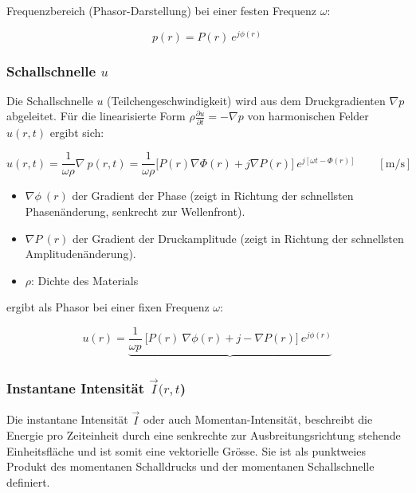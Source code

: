 Frequenzbereich (Phasor-Darstellung) bei einer festen Frequenz $\omega$:

\begin{equation}
p(r) = P(r) \: e^{j \phi (r)}
\label{helmholtz:PhasorSchalldruck}
\end{equation}

\subsubsection{Schallschnelle  $u$}
Die Schallschnelle $u$ (Teilchengeschwindigkeit) wird aus dem Druckgradienten $\nabla p$ abgeleitet. Für die linearisierte Form $ \rho \frac{\partial u}{\partial t} = - \nabla p$ von harmonischen Felder $u(r,t)$  ergibt sich:

\begin{equation}
u(r,t) = \frac{1}{\omega \rho} \nabla \: p(r,t) = \frac{1}{\omega \rho} \bigg[ P(r) \nabla \Phi(r) + j\nabla P(r)  \bigg] \: e^{j[\omega t -\Phi(r)]} \qquad [\si{\metre / \second}]
\end{equation}

\begin{itemize}
\item $\nabla \phi \: (r)$ der Gradient der Phase (zeigt in Richtung der schnellsten Phasenänderung, senkrecht zur Wellenfront).
\item $\nabla P \:(r)$ der Gradient der Druckamplitude (zeigt in Richtung der schnellsten Amplitudenänderung).
\item $\rho$: Dichte des Materials
\end{itemize}

ergibt als Phasor bei einer fixen Frequenz $\omega$:

\begin{equation}
u(r) = \underbrace{\frac{1}{\omega p} \: \bigg[ P(r) \: \nabla \phi(r) + j - \nabla P(r) \bigg] \: e^{j\phi (r)}}_{}
\label{helmholtz:PhasorSchallschnelle}
\end{equation}

\subsubsection{Instantane Intensität $\vec{I} (r, t$)}

Die instantane Intensität $\vec{I}$ oder auch Momentan-Intensität, beschreibt die Energie pro Zeiteinheit durch eine senkrechte zur Ausbreitungsrichtung stehende Einheitsfläche und ist somit eine vektorielle Grösse. Sie ist als punktweies Produkt des momentanen Schalldrucks und der momentanen Schallschnelle definiert.

